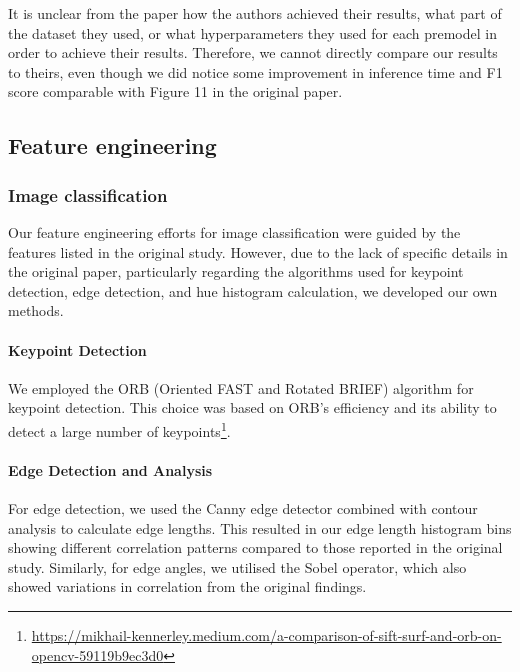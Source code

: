 It is unclear from the paper how the authors achieved their results, what part of the dataset they used, or what hyperparameters they used for each premodel in order to achieve their results. Therefore, we cannot directly compare our results to theirs, even though we did notice some improvement in inference time and F1 score comparable with Figure 11 in the original paper.




\subsection{Feature engineering}
\subsubsection{Image classification}

Our feature engineering efforts for image classification were guided by the features listed in the original study. However, due to the lack of specific details in the original paper, particularly regarding the algorithms used for keypoint detection, edge detection, and hue histogram calculation, we developed our own methods.

\paragraph{Keypoint Detection}
We employed the ORB (Oriented FAST and Rotated BRIEF) algorithm\supercite{Rublee2011ORBAE} for keypoint detection. This choice was based on ORB's efficiency and its ability to detect a large number of keypoints\footnote{\url{https://mikhail-kennerley.medium.com/a-comparison-of-sift-surf-and-orb-on-opencv-59119b9ec3d0}}.

\paragraph{Edge Detection and Analysis}
For edge detection, we used the Canny edge detector\supercite{canny1986computational} combined with contour analysis to calculate edge lengths. This resulted in our edge length histogram bins showing different correlation patterns compared to those reported in the original study. Similarly, for edge angles, we utilised the Sobel operator\supercite{kanopoulos1988design}, which also showed variations in correlation from the original findings.

